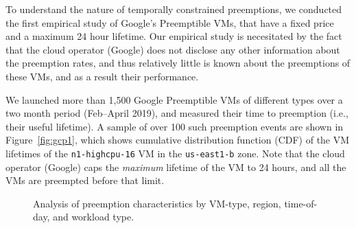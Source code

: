 To understand the nature of temporally constrained preemptions, we conducted the first empirical study of Google's Preemptible VMs, that have a fixed price and a maximum 24 hour lifetime.
Our empirical study is necesitated by the fact that the cloud operator (Google) does not disclose any other information about the preemption rates, and thus relatively little is known about the preemptions of these VMs, and as a result their performance.


We launched more than 1,500 Google Preemptible VMs of different types over a two month period (Feb--April 2019), and measured their time to preemption (i.e., their useful lifetime).\footnotemark
%
%
A sample of over 100 such preemption events are shown in Figure~\ref{fig:gcp1}, which shows cumulative distribution function (CDF) of the VM lifetimes of the \texttt{n1-highcpu-16} VM in the \texttt{us-east1-b} zone. 
Note that the cloud operator (Google) caps the \emph{maximum} lifetime of the VM to 24 hours, and all the VMs are preempted before that limit. 

\begin{figure}
  \hfill
{}
\hfill
{}

\label{fig:breakdown-all}
\caption{Analysis of preemption characteristics by VM-type, region, time-of-day, and workload type.}
\end{figure}

